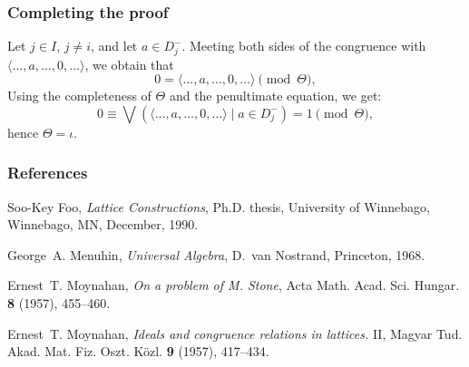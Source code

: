 \documentclass{beamer}
\begin{document}
\begin{frame}
\frametitle{Completing the proof}

Let $j \in I$, $j \neq i$, and let $a \in D_{j}^{-}$. 
Meeting both sides of the congruence  
with $\langle \ldots, a, \ldots, 0, \ldots \rangle$, 
we obtain that
\begin{equation*}
   0 = \langle \ldots, a, \ldots, 0, \ldots \rangle 
     \pmod{\Theta}, 
\end{equation*}
Using the completeness of $\Theta$ and the penultimate equation, 
we get:
\[
   0 \equiv \bigvee ( \langle \ldots, a, \ldots, 0, 
     \ldots \rangle \mid a \in D_{j}^{-} ) = 1 
     \pmod{\Theta}, 
\]
hence $\Theta = \iota$.
\end{frame}

\begin{frame}
\frametitle{References}

\begin{thebibliography}{9}

Soo-Key Foo, 
\emph{Lattice Constructions}, 
Ph.D. thesis, 
University of Winnebago, Winnebago, MN, December, 1990.

George~A. Menuhin, 
\emph{Universal Algebra}, 
D.~van Nostrand, Princeton, 1968.

Ernest~T. Moynahan, 
\emph{On a problem of M. Stone},
Acta Math. Acad. Sci. Hungar. \textbf{8} (1957), 
455--460.

Ernest~T. Moynahan, 
\emph{Ideals and congruence relations in lattices.} II,
Magyar Tud. Akad. Mat. Fiz. Oszt. K\"{o}zl. \textbf{9} 
(1957), 417--434.

\end{thebibliography}
\end{frame}
\end{document}
